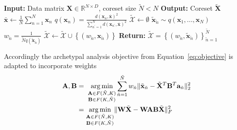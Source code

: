 \documentclass{article}
\DeclareMathOperator*{\argmin}{arg\,min}
\begin{document}
\begin{algorithm}[H]
    \caption{Coreset Construction for Archetypal Analysis}
    \label{alg:coreset_aa}
    \begin{algorithmic}[1]
    \State \textbf{Input:} Data matrix $\mathbf{X} \in \mathbb{R}^{N \times D}$, coreset size $\tilde{N} < N$
    \State \textbf{Output:} Coreset $\tilde{\mathbf{X}}$
    \State $\bar{\mathbf{x}} \gets \frac{1}{N} \sum_{n=1}^N \mathbf{x}_n$ 
        \State $q(\mathbf{x}_n) = \frac{d(\mathbf{x}_n, \bar{\mathbf{x}})^2}{\sum_{n^\prime=1}^N d(\mathbf{x}_{n^\prime}, \bar{\mathbf{x}})^2}$ 
    \EndFor
    \State $\tilde{\mathcal{X}} \gets \emptyset$
        \State $\tilde{\mathbf{x}}_{\tilde{n}} \sim q(\mathbf{x}_1, ..., \mathbf{x}_N)$ 
        \State $w_{\tilde{n}} = \frac{1}{\tilde{N} q(\tilde{\mathbf{x}}_{\tilde{n}})}$ 
        \State $\tilde{\mathcal{X}} \gets \tilde{\mathcal{X}} \cup \left\{ \left( w_{\tilde{n}}, \mathbf{x}_{\tilde{n}} \right) \right\}$
    \EndFor
    \State \textbf{Return:} $\tilde{\mathcal{X}} = \left\{ \left( w_{\tilde{n}}, \tilde{\mathbf{x}}_{\tilde{n}} \right) \right\}_{\tilde{n}=1}^{\tilde{N}}$
    \end{algorithmic}
\end{algorithm}

Accordingly the archetypal analysis objective from Equation~\ref{eq:objective} is adapted to incorporate weights
\begin{equation}
    \begin{aligned}
    \mathbf{A}, \mathbf{B}
        &= \; \underset{\begin{subarray}{c} \mathbf{A} \in F(\tilde{N}, K) \\
        \mathbf{B} \in F(K, \tilde{N}) \end{subarray}}{\argmin} \sum_{\tilde{n}=1}^{\tilde{N}} w_{\tilde{n}} \|  \tilde{\mathbf{x}}_{\tilde{n}} - \tilde{\mathbf{X}}^T \mathbf{B}^T \mathbf{a}_{\tilde{n}} \|_2^2 \\
        &= \underset{\begin{subarray}{c} \mathbf{A} \in F(\tilde{N}, K) \\
        \mathbf{B} \in F(K, \tilde{N}) \end{subarray}}{\argmin}
        \| \mathbf{W} \tilde{\mathbf{X}} - \mathbf{W} \mathbf{A} \mathbf{B} \tilde{\mathbf{X}} \|_F^2
    \end{aligned}
\end{equation}
\end{document}
